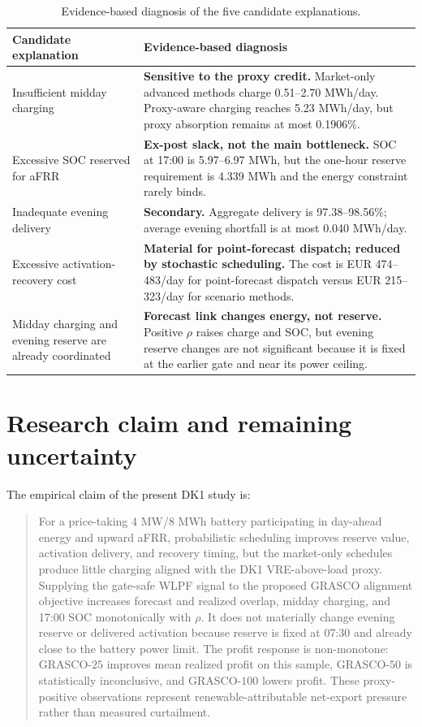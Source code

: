 \documentclass[11pt,a4paper]{article}
\begin{document}
\begin{table}[htbp]
  \centering
  \small
  \caption{Evidence-based diagnosis of the five candidate explanations.}
  \begin{tabular}{p{}p{}}
    \toprule
    Candidate explanation & Evidence-based diagnosis \\
    \midrule
    Insufficient midday charging
      & \textbf{Sensitive to the proxy credit.} Market-only advanced methods
        charge 0.51--2.70 MWh/day.  Proxy-aware charging reaches 5.23 MWh/day,
        but proxy absorption remains at most 0.1906\%. \\
    Excessive SOC reserved for aFRR
      & \textbf{Ex-post slack, not the main bottleneck.} SOC at 17:00 is
        5.97--6.97 MWh, but the one-hour reserve requirement is 4.339 MWh and
        the energy constraint rarely binds. \\
    Inadequate evening delivery
      & \textbf{Secondary.} Aggregate delivery is 97.38--98.56\%; average
        evening shortfall is at most 0.040 MWh/day. \\
    Excessive activation-recovery cost
      & \textbf{Material for point-forecast dispatch; reduced by stochastic
        scheduling.} The cost is
        EUR 474--483/day for point-forecast dispatch versus EUR 215--323/day
        for scenario methods. \\
    Midday charging and evening reserve are already coordinated
      & \textbf{Forecast link changes energy, not reserve.} Positive $\rho$
        raises charge and SOC, but evening reserve changes are not significant
        because it is fixed at the earlier gate and near its power ceiling. \\
    \bottomrule
  \end{tabular}
  \label{tab:problem-diagnosis}
\end{table}

\section{Research claim and remaining uncertainty}

The empirical claim of the present DK1 study is:
\begin{quote}
For a price-taking 4 MW/8 MWh battery participating in day-ahead energy and
upward aFRR, probabilistic scheduling improves reserve value, activation
delivery, and recovery timing, but the market-only schedules produce little
charging aligned with the DK1 VRE-above-load proxy.  Supplying the gate-safe
WLPF signal to the proposed GRASCO alignment objective increases forecast and
realized overlap, midday charging, and 17:00 SOC monotonically with $\rho$.
It does not materially change evening reserve or delivered activation because
reserve is fixed at 07:30 and already close to the battery power limit.  The
profit response is non-monotone: GRASCO-$25$ improves mean realized profit on
this sample, GRASCO-$50$ is statistically inconclusive, and GRASCO-$100$ lowers
profit.  These proxy-positive observations represent renewable-attributable
net-export pressure rather than measured curtailment.
\end{quote}
\end{document}
